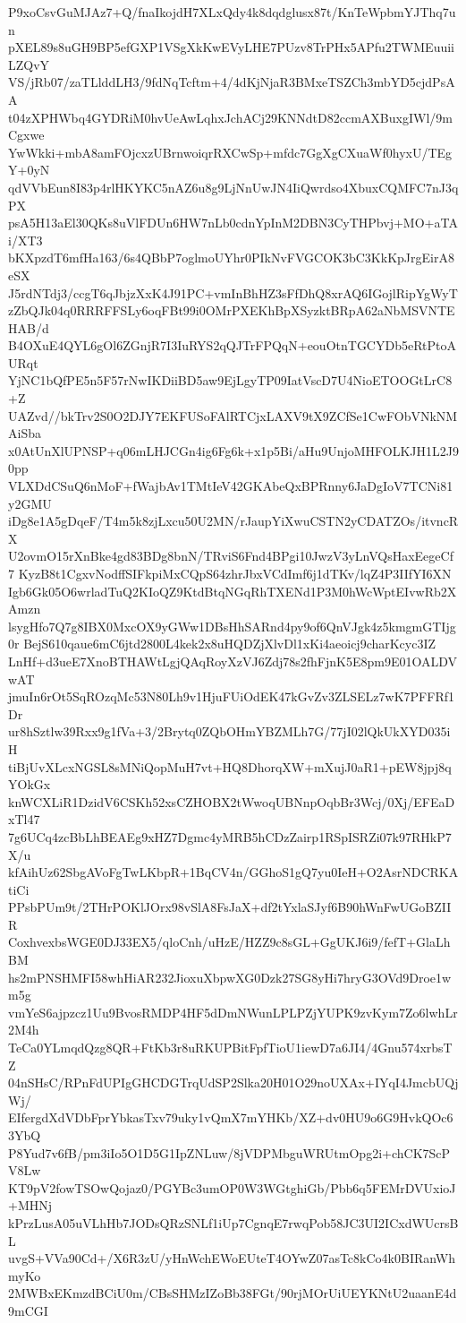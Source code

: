 P9xoCsvGuMJAz7+Q/fnaIkojdH7XLxQdy4k8dqdglusx87t/KnTeWpbmYJThq7un
pXEL89s8uGH9BP5efGXP1VSgXkKwEVyLHE7PUzv8TrPHx5APfu2TWMEuuiiLZQvY
VS/jRb07/zaTLlddLH3/9fdNqTcftm+4/4dKjNjaR3BMxeTSZCh3mbYD5cjdPsAA
t04zXPHWbq4GYDRiM0hvUeAwLqhxJchACj29KNNdtD82ccmAXBuxgIWl/9mCgxwe
YwWkki+mbA8amFOjcxzUBrnwoiqrRXCwSp+mfdc7GgXgCXuaWf0hyxU/TEgY+0yN
qdVVbEun8I83p4rlHKYKC5nAZ6u8g9LjNnUwJN4IiQwrdso4XbuxCQMFC7nJ3qPX
psA5H13aEl30QKs8uVlFDUn6HW7nLb0cdnYpInM2DBN3CyTHPbvj+MO+aTAi/XT3
bKXpzdT6mfHa163/6s4QBbP7oglmoUYhr0PIkNvFVGCOK3bC3KkKpJrgEirA8eSX
J5rdNTdj3/ccgT6qJbjzXxK4J91PC+vmInBhHZ3sFfDhQ8xrAQ6IGojlRipYgWyT
zZbQJk04q0RRRFFSLy6oqFBt99i0OMrPXEKhBpXSyzktBRpA62aNbMSVNTEHAB/d
B4OXuE4QYL6gOl6ZGnjR7I3IuRYS2qQJTrFPQqN+eouOtnTGCYDb5eRtPtoAURqt
YjNC1bQfPE5n5F57rNwIKDiiBD5aw9EjLgyTP09IatVscD7U4NioETOOGtLrC8+Z
UAZvd//bkTrv2S0O2DJY7EKFUSoFAlRTCjxLAXV9tX9ZCfSe1CwFObVNkNMAiSba
x0AtUnXlUPNSP+q06mLHJCGn4ig6Fg6k+x1p5Bi/aHu9UnjoMHFOLKJH1L2J90pp
VLXDdCSuQ6nMoF+fWajbAv1TMtIeV42GKAbeQxBPRnny6JaDgIoV7TCNi81y2GMU
iDg8e1A5gDqeF/T4m5k8zjLxcu50U2MN/rJaupYiXwuCSTN2yCDATZOs/itvncRX
U2ovmO15rXnBke4gd83BDg8bnN/TRviS6Fnd4BPgi10JwzV3yLnVQsHaxEegeCf7
KyzB8t1CgxvNodffSIFkpiMxCQpS64zhrJbxVCdImf6j1dTKv/lqZ4P3IIfYI6XN
Igb6Gk05O6wrladTuQ2KIoQZ9KtdBtqNGqRhTXENd1P3M0hWcWptEIvwRb2XAmzn
lsygHfo7Q7g8IBX0MxcOX9yGWw1DBsHhSARnd4py9of6QnVJgk4z5kmgmGTIjg0r
BejS610qaue6mC6jtd2800L4kek2x8uHQDZjXlvDl1xKi4aeoicj9charKcyc3IZ
LnHf+d3ueE7XnoBTHAWtLgjQAqRoyXzVJ6Zdj78s2fhFjnK5E8pm9E01OALDVwAT
jmuIn6rOt5SqROzqMc53N80Lh9v1HjuFUiOdEK47kGvZv3ZLSELz7wK7PFFRf1Dr
ur8hSztlw39Rxx9g1fVa+3/2Brytq0ZQbOHmYBZMLh7G/77jI02lQkUkXYD035iH
tiBjUvXLcxNGSL8sMNiQopMuH7vt+HQ8DhorqXW+mXujJ0aR1+pEW8jpj8qYOkGx
knWCXLiR1DzidV6CSKh52xsCZHOBX2tWwoqUBNnpOqbBr3Wcj/0Xj/EFEaDxTl47
7g6UCq4zcBbLhBEAEg9xHZ7Dgmc4yMRB5hCDzZairp1RSpISRZi07k97RHkP7X/u
kfAihUz62SbgAVoFgTwLKbpR+1BqCV4n/GGhoS1gQ7yu0IeH+O2AsrNDCRKAtiCi
PPsbPUm9t/2THrPOKlJOrx98vSlA8FsJaX+df2tYxlaSJyf6B90hWnFwUGoBZIIR
CoxhvexbsWGE0DJ33EX5/qloCnh/uHzE/HZZ9c8sGL+GgUKJ6i9/fefT+GlaLhBM
hs2mPNSHMFI58whHiAR232JioxuXbpwXG0Dzk27SG8yHi7hryG3OVd9Droe1wm5g
vmYeS6ajpzcz1Uu9BvosRMDP4HF5dDmNWunLPLPZjYUPK9zvKym7Zo6lwhLr2M4h
TeCa0YLmqdQzg8QR+FtKb3r8uRKUPBitFpfTioU1iewD7a6JI4/4Gnu574xrbsTZ
04nSHsC/RPnFdUPIgGHCDGTrqUdSP2Slka20H01O29noUXAx+IYqI4JmcbUQjWj/
EIfergdXdVDbFprYbkasTxv79uky1vQmX7mYHKb/XZ+dv0HU9o6G9HvkQOc63YbQ
P8Yud7v6fB/pm3iIo5O1D5G1IpZNLuw/8jVDPMbguWRUtmOpg2i+chCK7ScPV8Lw
KT9pV2fowTSOwQojaz0/PGYBc3umOP0W3WGtghiGb/Pbb6q5FEMrDVUxioJ+MHNj
kPrzLusA05uVLhHb7JODsQRzSNLf1iUp7CgnqE7rwqPob58JC3UI2ICxdWUcrsBL
uvgS+VVa90Cd+/X6R3zU/yHnWchEWoEUteT4OYwZ07asTc8kCo4k0BIRanWhmyKo
2MWBxEKmzdBCiU0m/CBsSHMzIZoBb38FGt/90rjMOrUiUEYKNtU2uaanE4d9mCGI
